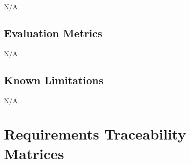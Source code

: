 \documentclass[12pt]{article}
\begin{document}
N/A

\subsection{Evaluation Metrics}

N/A

\subsection{Known Limitations}

N/A

\section{Requirements Traceability Matrices}
\end{document}
